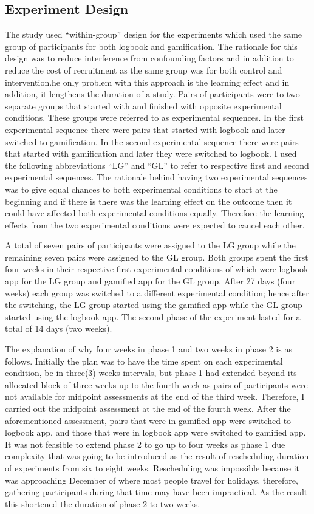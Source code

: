 \subsection{Experiment Design}
The study used ``within-group'' design for the experiments which used the same group of participants for both logbook and gamification. The rationale for this design was to reduce interference from confounding factors and in addition to reduce the cost of recruitment as the same group was for both control and intervention.he only problem with this approach is the learning effect and in addition, it lengthens the duration of a study. Pairs of participants were to two separate groups that started with and finished with opposite experimental conditions. These groups were referred to as experimental sequences. In the first experimental sequence there were pairs that started with logbook and later switched to gamification. In the second experimental sequence there were pairs that started with gamification and later they were switched to logbook. I used the following abbreviations ``LG'' and ``GL'' to refer to respective first and second experimental sequences. The rationale behind having two experimental sequences was to give equal chances to both experimental conditions to start at the beginning and if there is there was the learning effect on the outcome then it could have affected both experimental conditions equally. Therefore the learning effects from the two experimental conditions were expected to cancel each other.

A total of seven pairs of participants were assigned to the LG group while the remaining seven pairs were assigned to the GL group. Both groups spent the first four weeks in their respective first experimental conditions of which were logbook app for the LG group and gamified app for the GL group. After 27 days (four weeks) each group was switched to a different experimental condition; hence after the switching, the LG group started using the gamified app while the GL group started using the logbook app. The second phase of the experiment lasted for a total of 14 days (two weeks). 

The explanation of why four weeks in phase 1 and two weeks in phase 2 is as follows. Initially the plan was to have the time spent on each experimental condition, be in three(3) weeks intervals, but phase 1 had extended beyond its allocated block of three weeks up to the fourth week as pairs of participants were not available for midpoint assessments at the end of the third week. Therefore, I carried out the midpoint assessment at the end of the fourth week. After the aforementioned assessment, pairs that were in gamified app were switched to logbook app, and those that were in logbook app were switched to gamified app. It was not feasible to extend phase 2 to go up to four weeks as phase 1 due complexity that was going to be introduced as the result of rescheduling duration of experiments from six to eight weeks. Rescheduling was impossible because it was approaching December of where most people travel for holidays, therefore, gathering participants during that time may have been impractical. As the result this shortened the duration of phase 2 to two weeks. 
